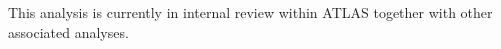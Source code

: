 This analysis is currently in internal review within ATLAS together with other associated analyses.
